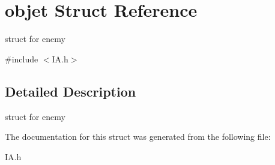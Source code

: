 \hypertarget{structobjet}{}\section{objet Struct Reference}
\label{structobjet}


struct for enemy  




{\ttfamily \#include $<$I\+A.\+h$>$}



\subsection{Detailed Description}
struct for enemy 

The documentation for this struct was generated from the following file\+:\begin{DoxyCompactItemize}
\item 
I\+A.\+h\end{DoxyCompactItemize}
